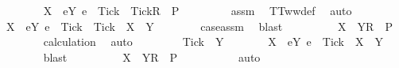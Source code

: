 \begin{isabellebody}
\ \ \ \ \isamarkupfalse%
\ {\isachardoublequoteopen}{\isasymrho}\ {\isacharat}\ {\isacharbrackleft}{\isacharbrackleft}X\ {\isasymunion}\ {\isacharbraceleft}e{\isasymin}Y{\isachardot}\ e\ {\isasymnoteq}\ Tick{\isacharbraceright}\ {\isasymunion}\ {\isacharbraceleft}Tick{\isacharbraceright}{\isacharbrackright}\isactrlsub R{\isacharbrackright}\ {\isasymin}\ P{\isachardoublequoteclose}\isanewline
\ \ \ \ \ \ \isamarkupfalse%
\ {}\ assm{}\ \isamarkupfalse%
\ TT{}ww{\isacharunderscore}def\ \isamarkupfalse%
\ auto\isanewline
\ \ \ \ \isamarkupfalse%
\ \isamarkupfalse%
\ {\isachardoublequoteopen}X\ {\isasymunion}\ {\isacharbraceleft}e{\isasymin}Y{\isachardot}\ e\ {\isasymnoteq}\ Tick{\isacharbraceright}\ {\isasymunion}\ {\isacharbraceleft}Tick{\isacharbraceright}\ {\isacharequal}\ X\ {\isasymunion}\ Y{\isachardoublequoteclose}\isanewline
\ \ \ \ \ \ \isamarkupfalse%
\ case{\isacharunderscore}assm\ \isamarkupfalse%
\ blast\isanewline
\ \ \ \ \isamarkupfalse%
\ \isamarkupfalse%
\ {\isachardoublequoteopen}{\isasymrho}\ {\isacharat}\ {\isacharbrackleft}{\isacharbrackleft}X\ {\isasymunion}\ Y{\isacharbrackright}\isactrlsub R{\isacharbrackright}\ {\isasymin}\ P{\isachardoublequoteclose}\isanewline
\ \ \ \ \ \ \isamarkupfalse%
\ calculation\ \isamarkupfalse%
\ auto\isanewline
\ \ \isamarkupfalse%
\isanewline
\ \ \ \ \isamarkupfalse%
\ {\isachardoublequoteopen}Tick\ {\isasymnotin}\ Y{\isachardoublequoteclose}\isanewline
\ \ \ \ \isamarkupfalse%
\ \isamarkupfalse%
\ {\isachardoublequoteopen}X\ {\isasymunion}\ {\isacharbraceleft}e{\isasymin}Y{\isachardot}\ e\ {\isasymnoteq}\ Tick{\isacharbraceright}\ {\isacharequal}\ X\ {\isasymunion}\ Y{\isachardoublequoteclose}\isanewline
\ \ \ \ \ \ \isamarkupfalse%
\ blast\isanewline
\ \ \ \ \isamarkupfalse%
\ \isamarkupfalse%
\ {\isachardoublequoteopen}{\isasymrho}\ {\isacharat}\ {\isacharbrackleft}{\isacharbrackleft}X\ {\isasymunion}\ Y{\isacharbrackright}\isactrlsub R{\isacharbrackright}\ {\isasymin}\ P{\isachardoublequoteclose}\isanewline
\ \ \ \ \ \ \isamarkupfalse%
\ {}\ \isamarkupfalse%
\ auto\isanewline
\ \ \isamarkupfalse%
\isanewline
{}\isamarkupfalse%
\isanewline
\ \ \isamarkupfalse%

\end{isabellebody}
